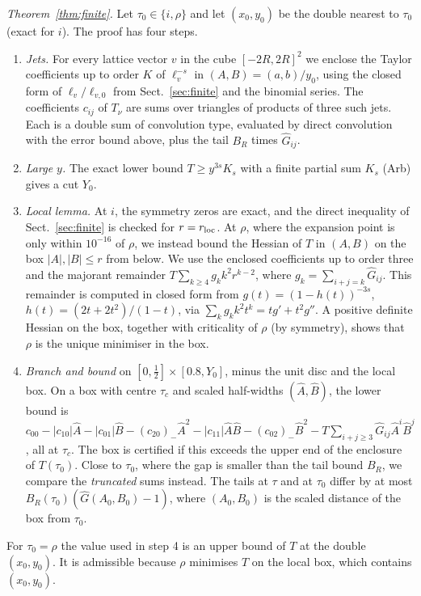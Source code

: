 \documentclass[10pt,twocolumn,a4paper]{article}
\theoremstyle{definition}
\begin{document}
\smallskip\noindent\emph{Theorem~\ref{thm:finite}.} Let $\tau_0\in\{i,\rho\}$ and let $(x_0,y_0)$ be the double nearest to $\tau_0$ (exact for $i$). The proof has four steps.
\begin{enumerate}\setlength\itemsep{1pt}
\item \emph{Jets.} For every lattice vector $v$ in the cube $[-2R,2R]^2$ we enclose the Taylor coefficients up to order $K$ of $\ell_v^{-s}$ in $(A,B)=(a,b)/y_0$, using the closed form of $\ell_v/\ell_{v,0}$ from Sect.~\ref{sec:finite} and the binomial series. The coefficients $c_{ij}$ of $T_\nu$ are sums over triangles of products of three such jets. Each is a double sum of convolution type, evaluated by direct convolution with the error bound above, plus the tail $B_R$ times $\hat G_{ij}$.
\item \emph{Large $y$.} The exact lower bound $T\ge y^{3s}K_s$ with a finite partial sum $K_s$ (Arb) gives a cut $Y_0$.
\item \emph{Local lemma.} At $i$, the symmetry zeros are exact, and the direct inequality of Sect.~\ref{sec:finite} is checked for $r=r_{\rm loc}$. At $\rho$, where the expansion point is only within $10^{-16}$ of $\rho$, we instead bound the Hessian of $T$ in $(A,B)$ on the box $|A|,|B|\le r$ from below. We use the enclosed coefficients up to order three and the majorant remainder $T\sum_{k\ge4}g_kk^2r^{k-2}$, where $g_k=\sum_{i+j=k}\hat G_{ij}$. This remainder is computed in closed form from $g(t)=(1-h(t))^{-3s}$, $h(t)=(2t+2t^2)/(1-t)$, via $\sum_kg_kk^2t^k=tg'+t^2g''$. A positive definite Hessian on the box, together with criticality of $\rho$ (by symmetry), shows that $\rho$ is the unique minimiser in the box.
\item \emph{Branch and bound} on $[0,\frac12]\times[0.8,Y_0]$, minus the unit disc and the local box. On a box with centre $\tau_c$ and scaled half-widths $(\hat A,\hat B)$, the lower bound is $c_{00}-|c_{10}|\hat A-|c_{01}|\hat B-(c_{20})_-\hat A^2-|c_{11}|\hat A\hat B-(c_{02})_-\hat B^2-T\sum_{i+j\ge3}\hat G_{ij}\hat A^i\hat B^j$, all at $\tau_c$. The box is certified if this exceeds the upper end of the enclosure of $T(\tau_0)$. Close to $\tau_0$, where the gap is smaller than the tail bound $B_R$, we compare the \emph{truncated} sums instead. The tails at $\tau$ and at $\tau_0$ differ by at most $B_R(\tau_0)(\hat G(A_0,B_0)-1)$, where $(A_0,B_0)$ is the scaled distance of the box from $\tau_0$.
\end{enumerate}
For $\tau_0=\rho$ the value used in step 4 is an upper bound of $T$ at the double $(x_0,y_0)$. It is admissible because $\rho$ minimises $T$ on the local box, which contains $(x_0,y_0)$.
\end{document}
